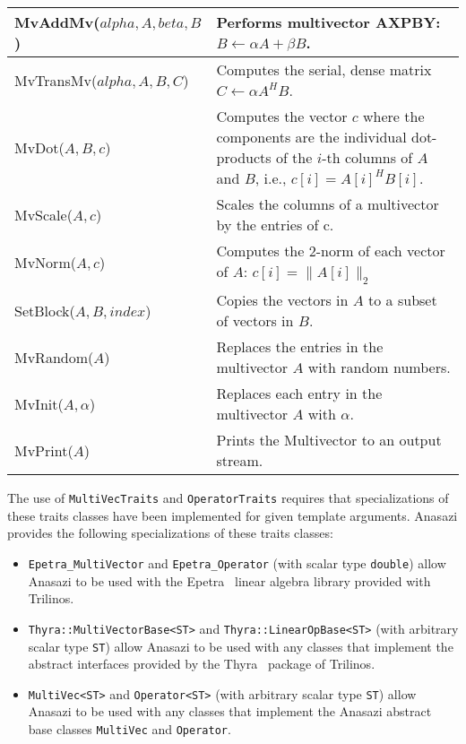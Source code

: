 \documentclass[acmtoms]{acmtrans2m}
\newcommand{\aspace}[1]{\texttt{#1}}
\begin{document}
\begin{table}
\begin{center}
\begin{tabular}{| p{4cm} | p{8cm} |}
MvAddMv($alpha,A,beta,B$)  & Performs multivector AXPBY: $ B \leftarrow \alpha A + \beta B$.
\\\hline

MvTransMv($alpha,A,B,C$) & Computes the serial, dense matrix $C \leftarrow \alpha A^H B$.
\\\hline

MvDot($A,B,c$) & Computes the vector $c$ where the components are the
individual dot-products of the $i$-th columns of $A$ and $B$, i.e.,
$c[i] = A[i]^H B[i]$.  \\\hline

MvScale($A,c$)    & Scales the columns of a multivector by the entries
of c. \\\hline

MvNorm($A,c$)     & Computes the 2-norm of each vector of
$A$: $c[i] = \|A[i]\|_2$  \\\hline

SetBlock($A,B,index$) & Copies the vectors in $A$ to a subset of vectors in
$B$. \\\hline

MvRandom($A$) & Replaces the entries in the multivector $A$ with random
numbers.  \\\hline

MvInit($A,\alpha$) & Replaces each entry in the multivector $A$ with $\alpha$.
\\\hline

MvPrint($A$)    & Prints the Multivector to an output stream.
\\\hline \hline
\end{tabular}
\end{center}
\end{table}

The use of \aspace{MultiVecTraits} and \aspace{OperatorTraits} requires that
specializations of these traits classes have been implemented for
given template arguments. Anasazi provides the following
specializations of these traits classes:
\begin{itemize}
  \item \aspace{Epetra\_MultiVector} and \aspace{Epetra\_Operator} (with scalar type
    \aspace{double}) allow Anasazi to be used with the Epetra~\cite{Trilinos:Epetra} linear
    algebra library provided with Trilinos.
  \item \aspace{Thyra::MultiVectorBase<ST>} and
    \aspace{Thyra::LinearOpBase<ST>} (with arbitrary scalar type
    \aspace{ST}) allow Anasazi to be used with any classes that implement the abstract interfaces
    provided by the Thyra~\cite{Trilinos:Thyra} package of Trilinos.
  \item \aspace{MultiVec<ST>} and \aspace{Operator<ST>} (with
    arbitrary scalar type \aspace{ST}) allow Anasazi to be used with any classes that implement
    the Anasazi abstract base classes \aspace{MultiVec} and \aspace{Operator}.
\end{itemize}
\end{document}

